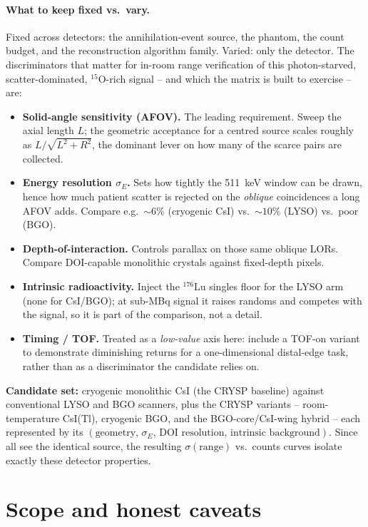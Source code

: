 \documentclass[11pt]{article}
\newcommand{\Ox}[1]{{}^{#1}\mathrm{O}}
\begin{document}
\paragraph{What to keep fixed vs.\ vary.}
Fixed across detectors: the annihilation-event source, the phantom, the count
budget, and the reconstruction algorithm family. Varied: only the detector. The
discriminators that matter for in-room range verification of this photon-starved,
scatter-dominated, $\Ox{15}$-rich signal -- and which the matrix is built to
exercise -- are:
\begin{itemize}[nosep]
\item \textbf{Solid-angle sensitivity (AFOV).} The leading requirement. Sweep the
axial length $L$; the geometric acceptance for a centred source scales roughly as
$L/\sqrt{L^2+R^2}$, the dominant lever on how many of the scarce pairs are
collected.
\item \textbf{Energy resolution $\sigma_E$.} Sets how tightly the \SI{511}{keV}
window can be drawn, hence how much patient scatter is rejected on the
\emph{oblique} coincidences a long AFOV adds. Compare e.g.\ $\sim\!6\%$ (cryogenic
CsI) vs.\ $\sim\!10\%$ (LYSO) vs.\ poor (BGO).
\item \textbf{Depth-of-interaction.} Controls parallax on those same oblique LORs.
Compare DOI-capable monolithic crystals against fixed-depth pixels.
\item \textbf{Intrinsic radioactivity.} Inject the ${}^{176}\mathrm{Lu}$ singles
floor for the LYSO arm (none for CsI/BGO); at sub-MBq signal it raises randoms and
competes with the signal, so it is part of the comparison, not a detail.
\item \textbf{Timing / TOF.} Treated as a \emph{low-value} axis here: include a
TOF-on variant to demonstrate diminishing returns for a one-dimensional
distal-edge task, rather than as a discriminator the candidate relies on.
\end{itemize}
\textbf{Candidate set:} cryogenic monolithic CsI (the CRYSP baseline) against
conventional LYSO and BGO scanners, plus the CRYSP variants -- room-temperature
CsI(Tl), cryogenic BGO, and the BGO-core/CsI-wing hybrid -- each represented by its
$(\text{geometry},\,\sigma_E,\,\text{DOI resolution},\,\text{intrinsic background})$.
Since all see the identical source, the resulting $\sigma(\text{range})$ vs.\
counts curves isolate exactly these detector properties.

\section{Scope and honest caveats}
\label{sec:scope}
\end{document}
